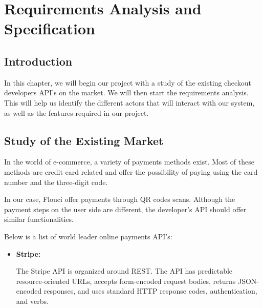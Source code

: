 
\setcounter{chapter}{1}
\chapter{Requirements Analysis and Specification}
\minitoc %
\graphicspath{{Chapter2/figures/}}


\pagestyle{fancy}
\fancyhf{}
\fancyhead[R]{\bfseries\rightmark}
\fancyfoot[R]{\thepage}
\renewcommand{\headrulewidth}{0.5pt}
\renewcommand{\footrulewidth}{0pt}
\renewcommand{\chaptermark}[1]{\markboth{\MakeUppercase{\chaptername~\thechapter. #1 }}{}}
\renewcommand{\sectionmark}[1]{\markright{\thechapter.\thesection~ #1}}

\begin{spacing}{1.2}
\section*{Introduction}
In this chapter, we will begin our project with a study of the existing checkout developers API's on the market. We will then start the requirements analysis. This will help us identify the different actors that will interact with our system, as well as the features required in our project.
\section{Study of the Existing Market}
In the world of e-commerce, a variety of payments methods exist.  Most of these methods are credit card related and offer the possibility of paying using the card number and the three-digit code.

In our case, Flouci offer payments through QR codes scans. Although the payment steps on the user side are different, the developer's API should offer similar functionalities.


Below is a list of world leader online payments API's:
\begin{itemize}
  \item \textbf{Stripe:}

 The Stripe\cite{stripe} API is organized around REST. The API has predictable resource-oriented URLs, accepts form-encoded request bodies, returns JSON-encoded responses, and uses standard HTTP response codes, authentication, and verbs.


\end{itemize}
\end{spacing}
